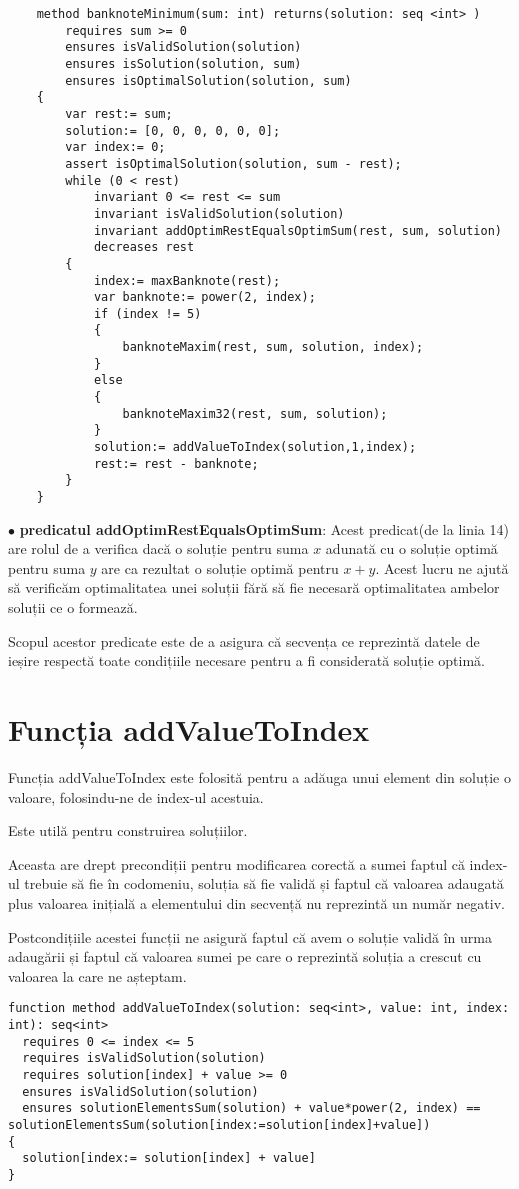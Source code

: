     \begin{lstlisting}
    method banknoteMinimum(sum: int) returns(solution: seq <int> )
        requires sum >= 0
        ensures isValidSolution(solution)
        ensures isSolution(solution, sum)
        ensures isOptimalSolution(solution, sum) 
    {
        var rest:= sum;
        solution:= [0, 0, 0, 0, 0, 0];
        var index:= 0;
        assert isOptimalSolution(solution, sum - rest);
        while (0 < rest)
            invariant 0 <= rest <= sum
            invariant isValidSolution(solution)
            invariant addOptimRestEqualsOptimSum(rest, sum, solution)
            decreases rest 
        {
            index:= maxBanknote(rest);
            var banknote:= power(2, index);
            if (index != 5) 
            {
                banknoteMaxim(rest, sum, solution, index);
            } 
            else 
            {
                banknoteMaxim32(rest, sum, solution);
            }
            solution:= addValueToIndex(solution,1,index);
            rest:= rest - banknote;
        }
    }
    \end{lstlisting}

$\bullet$ \textbf{predicatul addOptimRestEqualsOptimSum}: Acest predicat(de la linia 14) are rolul de a verifica dacă o soluție pentru suma $x$ 
adunată cu o soluție optimă pentru suma $y$ are ca rezultat o soluție optimă pentru $x+y$. Acest lucru ne ajută să verificăm 
optimalitatea unei soluții fără să fie necesară optimalitatea ambelor soluții ce o formează.\par
Scopul acestor predicate este de a asigura că secvența ce reprezintă datele de ieșire respectă toate condițiile necesare
pentru a fi considerată soluție optimă.

\section{Funcția addValueToIndex}
Funcția addValueToIndex este folosită pentru a adăuga unui element din soluție o valoare, folosindu-ne de index-ul acestuia.\par
Este utilă pentru construirea soluțiilor.\par
Aceasta are drept precondiții pentru modificarea corectă a sumei faptul că index-ul trebuie să fie în codomeniu, soluția să fie validă și
faptul că valoarea adaugată plus valoarea inițială a elementului din secvență nu reprezintă un număr negativ.\par
Postcondițiile acestei funcții ne asigură faptul că avem o soluție validă în urma adaugării și faptul că valoarea sumei pe care 
o reprezintă soluția a crescut cu valoarea la care ne așteptam.\par
\begin{lstlisting}
function method addValueToIndex(solution: seq<int>, value: int, index: int): seq<int>
  requires 0 <= index <= 5
  requires isValidSolution(solution)
  requires solution[index] + value >= 0
  ensures isValidSolution(solution)
  ensures solutionElementsSum(solution) + value*power(2, index) == solutionElementsSum(solution[index:=solution[index]+value])
{
  solution[index:= solution[index] + value]
}
\end{lstlisting}


